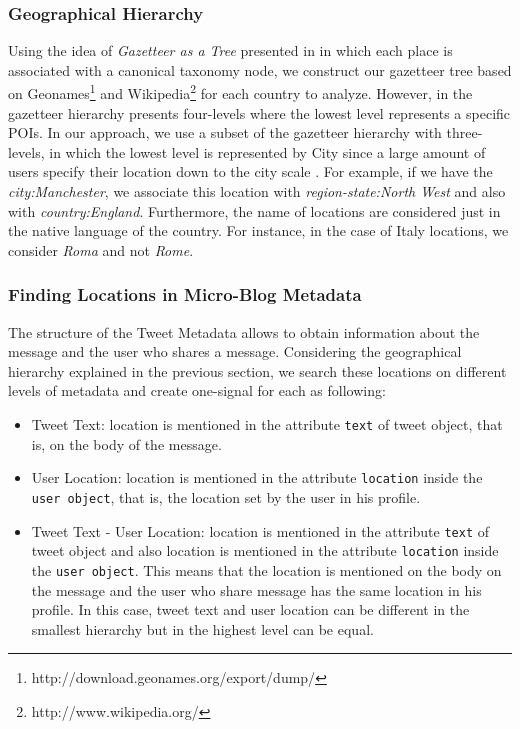 \documentclass[sigconf]{acmart}
\begin{document}
\subsubsection{Geographical Hierarchy}\label{sssec:geohie}
Using the idea of \textit{Gazetteer as a Tree} presented in \cite{yin2014pinpointing} in which each place is associated with a canonical taxonomy node, we construct our gazetteer tree based on Geonames\footnote{http://download.geonames.org/export/dump/} and Wikipedia\footnote{http://www.wikipedia.org/} for each country to analyze. However, in \cite{yin2014pinpointing} the gazetteer hierarchy presents four-levels where the lowest level represents a specific POIs. In our approach, we use a subset of the gazetteer hierarchy with three-levels, in which the lowest level is represented by City since a large amount of users specify their location down to the city scale \cite{hecht2011tweets}. For example, if we have the \textit{city:Manchester}, we associate this location with \textit{region-state:North West} and also with \textit{country:England}. Furthermore, the name of locations are considered just in the native language of the country. For instance, in the case of Italy locations, we consider \textit{Roma} and not \textit{Rome}.

\subsubsection{Finding Locations in Micro-Blog Metadata}

The structure of the Tweet Metadata allows to obtain information about the message and the user who shares a message. Considering the geographical hierarchy explained in the previous section, we search these locations on different levels of metadata and create one-signal for each as following:

\begin{itemize}
	\item Tweet Text: location is mentioned in the attribute \texttt{text} of tweet object, that is, on the body of the message.
	\item User Location: location is mentioned in the attribute \texttt{location} inside the \texttt{user object}, that is, the location set by the user in his profile.
	\item Tweet Text - User Location: location is mentioned in the attribute \texttt{text} of tweet object and also location is mentioned in the attribute \texttt{location} inside the \texttt{user object}. This means that the location is mentioned on the body on the message and the user who share message has the same location in his profile. In this case, tweet text and user location can be different in the smallest hierarchy but in the highest level can be equal. 
\end{itemize}
\end{document}
